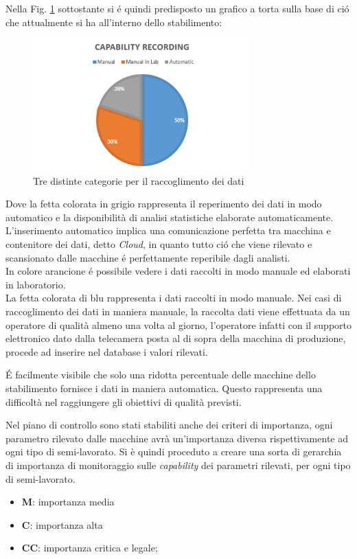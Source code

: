 Nella Fig. \ref{fig:capability-level.png} sottostante si é quindi predisposto un grafico a torta sulla base di ció che attualmente si ha all'interno dello stabilimento:

\begin{figure}[h]
  \centering
  \includegraphics[width=0.75\textwidth]{img/capability-level.png}
  \caption{Tre distinte categorie per il raccoglimento dei dati}
  \label{fig:capability-level.png}
\end{figure}


Dove la fetta colorata in grigio rappresenta il reperimento dei dati in modo automatico e la disponibilità di analisi statistiche elaborate automaticamente. \\
L'inserimento automatico implica una comunicazione perfetta tra macchina e contenitore dei dati, detto \textit{Cloud}, in quanto tutto ció che viene rilevato e scansionato dalle macchine é perfettamente reperibile dagli analisti. \\
In colore arancione é possibile vedere i dati raccolti in modo manuale ed elaborati in laboratorio. \\
La fetta colorata di blu rappresenta i dati raccolti in modo manuale.
Nei casi di raccoglimento dei dati in maniera manuale, la raccolta dati viene effettuata da un operatore di qualità almeno una volta al giorno, l'operatore infatti con il supporto elettronico dato dalla telecamera posta al di sopra della macchina di produzione, procede ad inserire nel database i valori rilevati.

É facilmente visibile che solo una ridotta percentuale delle macchine dello stabilimento fornisce i dati in maniera automatica. 
Questo rappresenta una difficoltà nel raggiungere gli obiettivi di qualità previsti.

Nel piano di controllo sono stati stabiliti anche dei criteri di importanza, ogni parametro rilevato dalle macchine avrà un'importanza diversa rispettivamente ad ogni tipo di semi-lavorato.
Si è quindi proceduto a creare una sorta di gerarchia di importanza di monitoraggio sulle \textit{capability} dei parametri rilevati, per ogni tipo di semi-lavorato.
\begin{itemize}
  \item \textbf{M}: importanza media
	\item \textbf{C}: importanza alta
	\item \textbf{CC}: importanza critica e legale;
\end{itemize}


